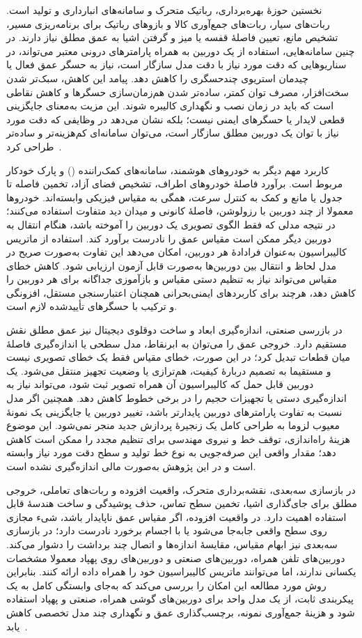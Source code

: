 نخستین حوزهٔ بهره‌برداری، رباتیک متحرک و سامانه‌های انبارداری و تولید است. ربات‌های سیار، ربات‌های جمع‌آوری کالا و بازوهای رباتیک برای برنامه‌ریزی مسیر، تشخیص مانع، تعیین فاصلهٔ قفسه یا میز و گرفتن اشیا به عمق مطلق نیاز دارند. در چنین سامانه‌هایی، استفاده از یک دوربین  به همراه پارامترهای درونی معتبر می‌تواند، در سناریوهایی که دقت مورد نیاز با دقت مدل سازگار است، نیاز به حسگر عمق فعال یا چیدمان استریوی چندحسگری را کاهش دهد. پیامد این کاهش، سبک‌تر شدن سخت‌افزار، مصرف توان کمتر، ساده‌تر شدن هم‌زمان‌سازی حسگرها و کاهش نقاطی است که باید در زمان نصب و نگهداری کالیبره شوند. این مزیت به‌معنای جایگزینی قطعی لایدار یا حسگرهای ایمنی نیست؛ بلکه نشان می‌دهد در وظایفی که دقت مورد نیاز با توان یک دوربین مطلق سازگار است، می‌توان سامانه‌ای کم‌هزینه‌تر و ساده‌تر طراحی کرد~\cite{Casser2019DepthSensors}.

کاربرد مهم دیگر به خودروهای هوشمند، سامانه‌های کمک‌راننده () و پارک خودکار مربوط است. برآورد فاصلهٔ خودروهای اطراف، تشخیص فضای آزاد، تخمین فاصله تا جدول یا مانع و کمک به کنترل سرعت، همگی به مقیاس فیزیکی وابسته‌اند. خودروها معمولا از چند دوربین با رزولوشن، فاصلهٔ کانونی و میدان دید متفاوت استفاده می‌کنند؛ در نتیجه مدلی که فقط الگوی تصویری یک دوربین را آموخته باشد، هنگام انتقال به دوربین دیگر ممکن است مقیاس عمق را نادرست برآورد کند. استفاده از ماتریس کالیبراسیون به‌عنوان فرادادهٔ هر دوربین، امکان می‌دهد این تفاوت به‌صورت صریح در مدل لحاظ و انتقال بین دوربین‌ها به‌صورت قابل آزمون ارزیابی شود. کاهش خطای مقیاس می‌تواند نیاز به تنظیم دستی مقیاس و بازآموزی جداگانه برای هر دوربین را کاهش دهد، هرچند برای کاربردهای ایمنی‌بحرانی همچنان اعتبارسنجی مستقل، افزونگی و ترکیب با حسگرهای تأییدشده لازم است.

در بازرسی صنعتی، اندازه‌گیری ابعاد و ساخت دوقلوی دیجیتال نیز عمق مطلق نقش مستقیم دارد. خروجی عمق را می‌توان به ابرنقاط، مدل سطحی یا اندازه‌گیری فاصلهٔ میان قطعات تبدیل کرد؛ در این صورت، خطای مقیاس فقط یک خطای تصویری نیست و مستقیما به تصمیم دربارهٔ کیفیت، هم‌ترازی یا وضعیت تجهیز منتقل می‌شود. یک دوربین قابل حمل که کالیبراسیون آن همراه تصویر ثبت شود، می‌تواند نیاز به اندازه‌گیری دستی یا تجهیزات حجیم را در برخی خطوط کاهش دهد. همچنین اگر مدل نسبت به تفاوت پارامترهای دوربین پایدارتر باشد، تغییر دوربین یا جایگزینی یک نمونهٔ معیوب لزوما به طراحی کامل یک زنجیرهٔ پردازش جدید منجر نمی‌شود. این موضوع هزینهٔ راه‌اندازی، توقف خط و نیروی مهندسی برای تنظیم مجدد را ممکن است کاهش دهد؛ مقدار واقعی این صرفه‌جویی به نوع خط تولید و سطح دقت مورد نیاز وابسته است و در این پژوهش به‌صورت مالی اندازه‌گیری نشده است.

در بازسازی سه‌بعدی، نقشه‌برداری متحرک، واقعیت افزوده و ربات‌های تعاملی، خروجی مطلق برای جای‌گذاری اشیا، تخمین سطح تماس، حذف پوشیدگی و ساخت هندسهٔ قابل استفاده اهمیت دارد. در واقعیت افزوده، اگر مقیاس عمق ناپایدار باشد، شیء مجازی روی سطح واقعی جابه‌جا می‌شود یا با اجسام برخورد نادرست دارد؛ در بازسازی سه‌بعدی نیز ابهام مقیاس، مقایسهٔ اندازه‌ها و اتصال چند برداشت را دشوار می‌کند. دوربین‌های تلفن همراه، دوربین‌های صنعتی و دوربین‌های روی پهپاد معمولا مشخصات یکسانی ندارند، اما می‌توانند ماتریس کالیبراسیون خود را همراه داده ارائه کنند. بنابراین روش مورد مطالعه این امکان را بررسی می‌کند که به‌جای وابستگی کامل به یک پیکربندی ثابت، از یک مدل واحد برای دوربین‌های گوشی همراه، صنعتی و پهپاد استفاده شود و هزینهٔ جمع‌آوری نمونه، برچسب‌گذاری عمق و نگهداری چند مدل تخصصی کاهش یابد~\cite{Ranftl2019Robust,Piccinelli2024UniDepth}.


